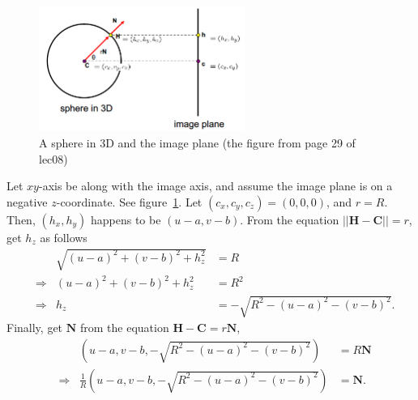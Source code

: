 \documentclass[a4paper,10pt]{article}
\begin{document}
\begin{figure}[H]
\includegraphics[width=0.6\textwidth]{sphere}
\centering
\caption{A sphere in 3D and the image plane (the figure from page 29 of lec08)}
\label{fig:sphere}
\end{figure}

Let $xy$-axis be along with the image axis, and assume the image plane is on a negative $z$-coordinate.
See figure~\ref{fig:sphere}.
Let $(c_x, c_y, c_z) = (0, 0, 0)$, and $r = R$.
Then, $(h_x, h_y)$ happens to be $(u - a, v - b)$.
From the equation $||\bm{H} - \bm{C}|| = r$, get $h_z$ as follows
\begin{align*}
&& \sqrt{ (u-a)^2 + (v-b)^2 + h_z^2 } &= R \\
&\Rightarrow& (u-a)^2 + (v-b)^2 + h_z^2 &= R^2 \\
&\Rightarrow& h_z &= - \sqrt{ R^2 - (u-a)^2 - (v-b)^2 }.
\end{align*}
Finally, get $\bm{N}$ from the equation $\bm{H} - \bm{C} = r \bm{N}$,
\begin{align*}
&& (u-a, v-b, - \sqrt{ R^2 - (u-a)^2 - (v-b)^2 }) &= R \bm{N} \\
&\Rightarrow& \frac{1}{R} (u-a, v-b, - \sqrt{ R^2 - (u-a)^2 - (v-b)^2 }) &= \bm{N}.
\end{align*}
\end{document}
